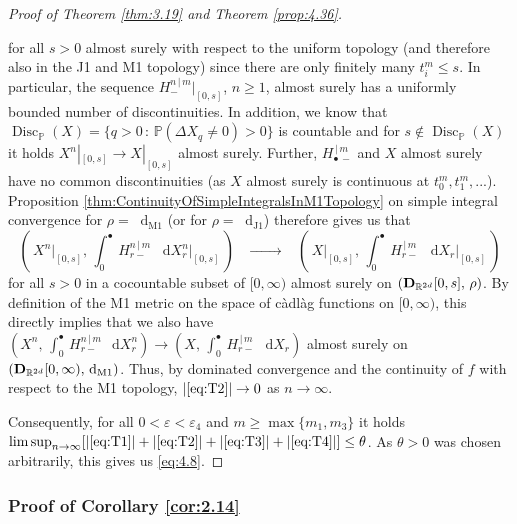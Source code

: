 \documentclass[11pt]{article}
\theoremstyle{definition}\newtheorem{example}[theorem]{Example}
\theoremstyle{definition}\newtheorem{counterexample}[theorem]{Counterexample}
\theoremstyle{definition}\newtheorem{remark}[theorem]{Remark}
\theoremstyle{definition}\newtheorem{defi}[theorem]{Definition}
\numberwithin{equation}{section}
\newcommand{\R}{\mathbb{R}}
\newcommand{\D}{{\bf D}}											%
\newcommand*\diff{\mathop{}\!\mathrm{d}}								%
\newcommand{\Pro}{\mathbb{P}}										%
\renewcommand{\|}{\; : \, \;}											%
\newcommand{\conv}[2]{\; \xrightarrow[ {#1}]{#2} \; }						%
\newcommand{\dJ}{\diff_{\operatorname{J1}}}								%
\newcommand{\dM}{\diff_{\operatorname{M1}}}							%
\begin{document}
\begin{proof}[Proof of Theorem \ref{thm:3.19} and Theorem \ref{prop:4.36}]
\begin{itemize}
		for all $s>0$ almost surely with respect to the uniform topology (and therefore also in the J1 and M1 topology) since there are only finitely many $t^m_i \le s$. In particular, the sequence $H_{-}^{n\, \vert \, m}|_{[0,s]}$, $n\ge 1$, almost surely has a uniformly bounded number of discontinuities. In addition, we know that $\operatorname{Disc}_\Pro(X)=\{q>0\,: \, \Pro(\Delta X_q \neq 0)> 0\}$ is countable and for $s \notin \operatorname{Disc}_\Pro(X)$ it holds $X^n|_{[0,s]} \to X|_{[0,s]}$ almost surely. Further, $H_{\bullet\, -}^{\, \vert \, m}$ and $X$ almost surely have no common discontinuities (as $X$ almost surely is continuous at $t^m_0,t^m_{1},...$). Proposition \ref{thm:ContinuityOfSimpleIntegralsInM1Topology} on simple integral convergence for $\rho=\dM$ (or \cite[Equations (1.12)-(1.13)]{kurtzprotter} for $\rho=\dJ$) therefore gives us that 
		$$ \left( \, X^n|_{[0,s]}, \, \int_0^{\bullet} \, H^{n\, \vert \, m}_{ r- } \; \diff X^n_r\big|_{[0,s]}\, \right) \; \; \conv{\phantom{n\to \infty}}{} \; \;  \left( \, X|_{[0,s]}, \,\int_0^{\bullet} \, H^{\, \vert \, m}_{ r- } \; \diff X_r\big|_{[0,s]}\, \right)$$
		for all $s>0$ in a cocountable subset of $[0,\infty)$ almost surely on $(\D_{\R^{2d}}[0,s], \, \rho)$. By definition of the M1 metric on the space of càdlàg functions on $[0,\infty)$, this directly implies that we also have $(  X^n ,\, \int_0^{\bullet} \, H^{n\, \vert \, m}_{ r- } \, \diff X^n_r )\to  (  X, \,\int_0^{\bullet} \, H^{\, \vert \, m}_{ r- } \, \diff X_r )$ almost surely on $(\D_{\R^{2d}}[0,\infty), \, \dM)$.
		Thus, by dominated convergence and the continuity of $f$ with respect to the M1 topology, $|\eqref{eq:T2}| \to 0$ as $n\to \infty$.
	\end{itemize}
	Consequently, for all $0<\varepsilon<\varepsilon_4$ and $m\ge \operatorname{max}\{m_1,m_3\}$ it holds $\limsup_{n\to \infty} [|\eqref{eq:T1}|+ |\eqref{eq:T2}| + |\eqref{eq:T3}| +|\eqref{eq:T4}| ] \le \theta$. As $\theta>0$ was chosen arbitrarily, this gives us \eqref{eq:4.8}.
\end{proof}

\subsubsection{Proof of Corollary \ref{cor:2.14}}
\label{subsec:Proof_of_Cor_3.16}
\end{document}
